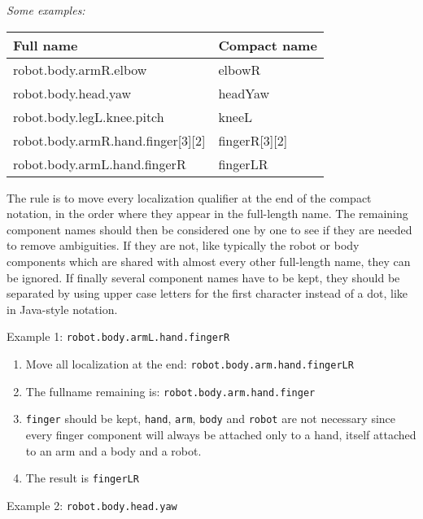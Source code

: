 \documentclass[a4paper]{article}
\newcommand\liststyleLi{%
\renewcommand\theenumi{\arabic{enumi}}
\renewcommand\theenumii{\arabic{enumii}}
\renewcommand\theenumiii{\arabic{enumiii}}
\renewcommand\theenumiv{\arabic{enumiv}}
\renewcommand\labelenumi{\theenumi.}
\renewcommand\labelenumii{\theenumii.}
\renewcommand\labelenumiii{\theenumiii.}
\renewcommand\labelenumiv{\theenumiv.}
}
\begin{document}
{\sffamily\itshape
Some examples:}

\begin{flushleft}
\tablehead{}
\begin{supertabular}{|m{9.008cm}|m{5.533cm}|}
\hline
{}\sffamily Full name &
\sffamily Compact name\\\hline
{}\ttfamily robot.body.armR.elbow &
\ttfamily elbowR\\\hline
{}\ttfamily robot.body.head.yaw &
\ttfamily headYaw\\\hline
{}\ttfamily robot.body.legL.knee.pitch &
\ttfamily kneeL\\\hline
{}\ttfamily robot.body.armR.hand.finger[3][2] &
\ttfamily fingerR[3][2]\\\hline
{}\ttfamily robot.body.armL.hand.fingerR &
\ttfamily fingerLR\\\hline
\end{supertabular}
\end{flushleft}
{\sffamily
The rule is to move every localization qualifier at the end of the
compact notation, in the order where they appear in the full-length
name. The remaining component names should then be considered one by
one to see if they are needed to remove ambiguities. If they are not,
like typically the robot or body components which are shared with
almost every other full-length name, they can be ignored. If finally
several component names have to be kept, they should be separated by
using upper case letters for the first character instead of a dot, like
in Java-style notation.}

{\sffamily
Example 1: \texttt{robot.body.armL.hand.fingerR}}

\liststyleLi
\begin{enumerate}
\item {\sffamily
Move all localization at the end: \texttt{robot.body.arm.hand.fingerLR}}
\item {\sffamily
The fullname remaining is: \texttt{robot.body.arm.hand.finger}}
\item {\sffamily
\texttt{finger} should be kept, \texttt{hand}, \texttt{arm},
\texttt{body} and \texttt{robot} are not necessary since every finger
component will always be attached only to a hand, itself attached to an
arm and a body and a robot.}
\item {\sffamily
The result is \texttt{fingerLR}}
\end{enumerate}
{\sffamily
Example 2: \texttt{robot.body.head.yaw}}
\end{document}
